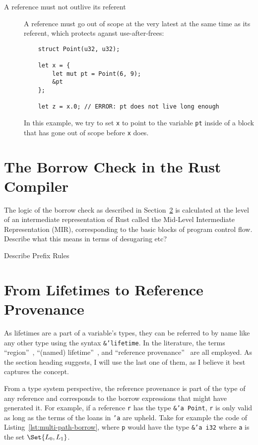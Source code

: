 \documentclass{UUThesisTemplate}
\newcommand{\fixme}[1] {{\color{red}#1}}
\newcommand{\InRust}[1]{\texttt{#1}}
\begin{document}
\begin{description}
\item[A reference must not outlive its referent] A reference must go out of
  scope at the very latest at the same time as its referent, which protects
  aganst use-after-frees:
  \begin{verbatim}
    struct Point(u32, u32);
    
    let x = {
        let mut pt = Point(6, 9);
        &pt
    };
    
    let z = x.0; // ERROR: pt does not live long enough
  \end{verbatim}

  In this example, we try to set \InRust{x} to point to the variable \InRust{pt}
  inside of a block that has gone out of scope before \InRust{x} does.
\end{description}


\section{The Borrow Check in the Rust Compiler}
\label{sec:rust-specificts}

The logic of the borrow check as described in
Section~\ref{sec:reference-provenance} is calculated at the level of an
intermediate representation of Rust called the Mid-Level Intermediate
Representation (MIR), corresponding to the basic blocks of program control flow.
\fixme{Describe what this means in terms of desugaring etc?}

\fixme{Describe Prefix Rules}

\section{From Lifetimes to Reference Provenance}
\label{sec:reference-provenance}

As lifetimes are a part of a variable's types, they can be referred to by name
like any other type using the syntax \InRust{&'lifetime}. In the literature, the
terms ``region''~\cite{matsakis_alias-based_2018}, ``(named)
lifetime''~\nocite{noauthor_rfc_2019}, and ``reference
provenance''~\cite{weiss_oxide:_2019} are all employed. As the section heading
suggests, I will use the last one of them, as I believe it best captures the
concept.

From a type system perspective, the reference provenance is part of the type of
any reference and corresponds to the borrow expressions that might have
generated it. For example, if a reference \InRust{r} has the type \InRust{&'a
  Point}, \InRust{r} is only valid as long as the terms of the loans in
\InRust{'a} are upheld. Take for example the code of
Listing~\ref{lst:multi-path-borrow}, where \InRust{p} would have the type
\InRust{&'a i32} where \InRust{a} is the set $\Set{L_0, L_1}$.
\end{document}
